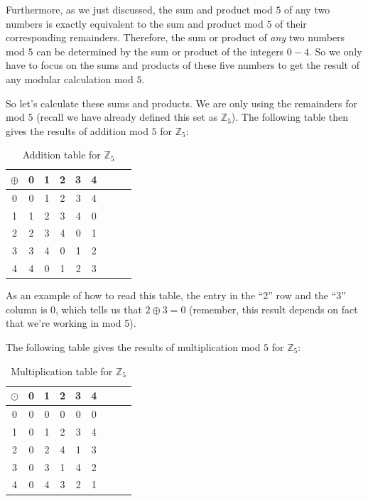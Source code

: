 Furthermore, as we just discussed, the sum and product mod $5$ of any two numbers is exactly equivalent to the sum and product mod $5$ of their corresponding remainders.  Therefore, the sum or product of \emph{any} two numbers mod $5$ can be determined by the sum or product of the integers $0-4$.  So we only have to focus on the sums and products of these five numbers to get the result of any modular calculation mod $5$.  

So let's calculate these sums and products.  We are only using the remainders for mod $5$ (recall we have already defined this set as  ${\mathbb Z}_{5}$).
The following table then gives the results of addition mod $5$ for ${\mathbb Z}_{5}$:

\begin{table}[h]
\caption{\label{groups_Z5_add_table}Addition table for ${\mathbb Z}_5$}{\small
\begin{center}
\begin{tabular}{c|cccccccc}
$\oplus$ & 0 & 1 & 2 & 3 & 4 \\
\hline
0        & 0 & 1 & 2 & 3 & 4 \\
1       & 1 & 2 & 3 & 4 & 0 \\
2       & 2 & 3 & 4 & 0 & 1\\
3       & 3 & 4 & 0 & 1 & 2\\
4       & 4 & 0 & 1 & 2 & 3\\

\end{tabular}
\end{center}
}
\end{table}

\noindent
As an example of how to read this table, the entry in the ``2'' row and the ``3'' column is 0, which tells us that $2 \oplus 3 = 0$ 
(remember, this result depends on fact that we're working in mod 5).

The following table gives the results of multiplication mod $5$ for ${\mathbb Z}_{5}$:

\begin{table}[h]
\caption{\label{groups_Z5_mult_table} Multiplication table for ${\mathbb Z}_5$}
{\small
\begin{center}
\begin{tabular}{c|cccccccc}
$\odot$ & 0 & 1 & 2 & 3 & 4 \\
\hline
0       & 0 & 0 & 0 & 0 & 0 \\
1       & 0 & 1 & 2 & 3 & 4  \\
2       & 0 & 2 & 4 & 1 & 3  \\
3       & 0 & 3 & 1 & 4 & 2  \\
4       & 0 & 4 & 3 & 2 & 1  \\

\end{tabular}
\end{center}
}
\end{table}

